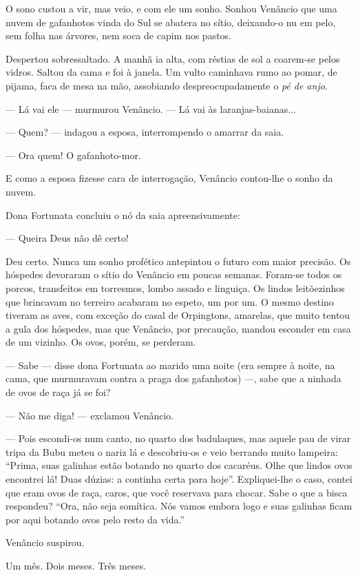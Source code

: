 O sono custou a vir, mas veio, e com ele um sonho. Sonhou Venâncio que
uma nuvem de gafanhotos vinda do Sul se abatera no sítio, deixando-o nu
em pelo, sem folha nas árvores, nem soca de capim nos pastos.

Despertou sobressaltado. A manhã ia alta, com réstias de sol a coarem-se
pelos vidros. Saltou da cama e foi à janela. Um vulto caminhava rumo ao
pomar, de pijama, faca de mesa na mão, assobiando despreocupadamente o
\emph{pé de anjo}.

--- Lá vai ele --- murmurou Venâncio. --- Lá vai às laranjas-baianas...

--- Quem? --- indagou a esposa, interrompendo o amarrar da saia.

--- Ora quem! O gafanhoto-mor.

E como a esposa fizesse cara de interrogação, Venâncio contou-lhe o
sonho da nuvem.

Dona Fortunata concluiu o nó da saia apreensivamente:

--- Queira Deus não dê certo!

Deu certo. Nunca um sonho profético antepintou o futuro com maior
precisão. Os hóspedes devoraram o sítio do Venâncio em poucas semanas.
Foram-se todos os porcos, transfeitos em torresmos, lombo assado e
linguiça. Os lindos leitõezinhos que brincavam no terreiro acabaram no
espeto, um por um. O mesmo destino tiveram as aves, com exceção do casal
de Orpingtons, amarelas, que muito tentou a gula dos hóspedes, mas que
Venâncio, por precaução, mandou esconder em casa de um vizinho. Os ovos,
porém, se perderam.

--- Sabe --- disse dona Fortunata ao marido uma noite (era sempre à
noite, na cama, que murmuravam contra a praga dos gafanhotos) ---, sabe
que a ninhada de ovos de raça já se foi?

--- Não me diga! --- exclamou Venâncio.

--- Pois escondi-os num canto, no quarto dos badulaques, mas aquele pau
de virar tripa da Bubu meteu o nariz lá e descobriu-os e veio berrando
muito lampeira: ``Prima, suas galinhas estão botando no quarto dos
cacaréus. Olhe que lindos ovos encontrei lá! Duas dúzias: a continha
certa para hoje''. Expliquei-lhe o caso, contei que eram ovos de raça,
caros, que você reservava para chocar. Sabe o que a bisca respondeu?
``Ora, não seja somítica. Nós vamos embora logo e suas galinhas ficam
por aqui botando ovos pelo resto da vida.''

Venâncio suspirou.

Um mês. Dois meses. Três meses.

